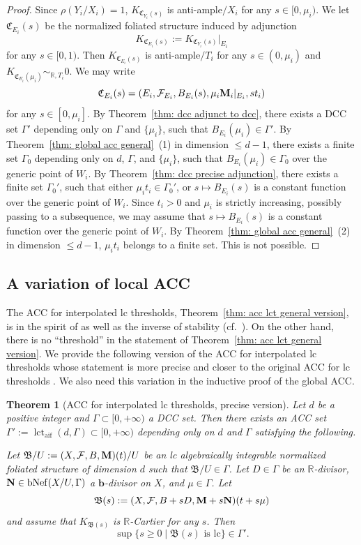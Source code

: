 \documentclass[11pt,reqno]{amsart}
\numberwithin{equation}{section}
\newcommand{\bb}{\bm{b}}
\newcommand{\Mm}{{\bf{M}}}
\newcommand{\Nn}{{\bf{N}}}
\newcommand{\Cc}{\mathfrak{C}}
\newcommand{\aif}{{\operatorname{aif}}}
\newcommand{\lct}{\operatorname{lct}}
\newcommand{\Bb}{{\mathfrak{B}}}
\newcommand{\Ff}{\mathcal{F}}
\newcommand{\Ii}{\Gamma}
\newcommand{\bNef}{\mathrm{bNef}}
\newtheorem{thm}{Theorem}[section]
\theoremstyle{definition}
\begin{document}
\begin{proof}
Since $\rho(Y_i/X_i)=1$, $K_{\Cc_{Y_i}(s)}$ is anti-ample$/X_i$ for any $s\in [0,\mu_i)$. We let $\Cc_{E_i}(s)$ be the normalized foliated structure induced by adjunction
$$K_{\Cc_{E_i}(s)}:=K_{\Cc_{Y_i}(s)}|_{E_i}$$
for any $s\in [0,1)$. Then $K_{\Cc_{E_i}(s)}$ is anti-ample$/T_i$ for any $s\in (0,\mu_i)$ and $K_{\Cc_{E_i}(\mu_i)}\sim_{\mathbb R,T_i}0$. We may write
$$\Cc_{E_i}(s)=(E_i,\Ff_{E_i},B_{E_i}(s),\mu_i\Mm_i|_{E_i},st_i)$$
for any $s\in [0,\mu_i]$. By Theorem~\ref{thm: dcc adjunct to dcc}, there exists a DCC set $\Ii'$ depending only on $\Ii$ and $\{\mu_i\}$, such that $B_{E_i}(\mu_i)\in\Ii'$. By Theorem~\ref{thm: global acc general}~(1) in dimension $\leq d-1$, there exists a finite set $\Ii_0$ depending only on $d$, $\Ii$, and $\{\mu_i\}$, such that $B_{E_i}(\mu_i)\in\Ii_0$ over the generic point of $W_i$. By Theorem~\ref{thm: dcc precise adjunction}, there exists a finite set $\Ii_0'$, such that either $\mu_it_i\in\Ii_0'$, or $s\mapsto B_{E_i}(s)$ is a constant function over the generic point of $W_i$. Since $t_i>0$ and $\mu_i$ is strictly increasing, possibly passing to a subsequence, we may assume that $s\mapsto B_{E_i}(s)$ is a constant function over the generic point of $W_i$. By Theorem~\ref{thm: global acc general}~(2) in dimension $\leq d-1$, $\mu_it_i$ belongs to a finite set. This is not possible.
\end{proof}

\subsection{A variation of local ACC} The ACC for interpolated lc thresholds, Theorem~\ref{thm: acc lct general version}, is in the spirit of \cite[Theorem~A]{HMX14} as well as the inverse of stability (cf.~\cite[Section~12]{Sho20}). On the other hand, there is no ``threshold'' in the statement of Theorem~\ref{thm: acc lct general version}. We provide the following version of the ACC for interpolated lc thresholds whose statement is more precise and closer to the original ACC for lc thresholds \cite[Theorem~1.1]{HMX14}. We also need this variation in the inductive proof of the global ACC.


\begin{thm}[ACC for interpolated lc thresholds, precise version]\label{thm: ACC precise}
     Let $d$ be a positive integer and $\Ii\subset [0,+\infty)$ a DCC set. Then there exists an ACC set $\Ii':=\lct_{\aif}(d,\Ii)\subset [0,+\infty)$ depending only on $d$ and $\Ii$ satisfying the following.

     Let $\Bb/U:=(X,\Ff,B,\Mm)(t)/U$ be an lc algebraically integrable normalized foliated structure of dimension $d$ such that $\Bb/U\in\Ii$. Let $D\in\Ii$ be an $\mathbb R$-divisor, $\Nn\in\bNef(X/U,\Ii)$ a $\bb$-divisor on $X$, and $\mu\in\Ii$. Let
     $$\Bb(s):=(X,\Ff,B+sD,\Mm+s\Nn)(t+s\mu)$$
and assume that $K_{\Bb(s)}$ is $\mathbb R$-Cartier for any $s$. Then
     $$\sup\{s\geq 0\mid \Bb(s)\text{ is lc}\}\in\Ii'.$$
\end{thm}
\end{document}
